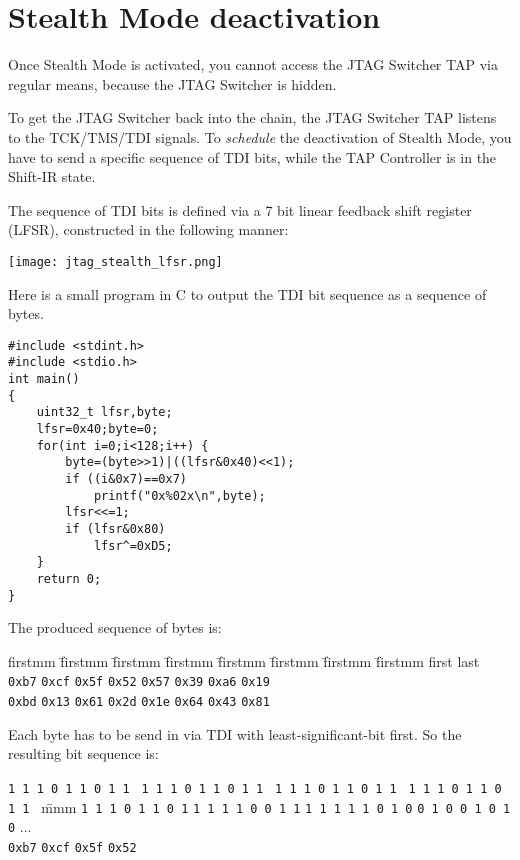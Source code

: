 \documentclass[10pt,english,a4paper]{report}
\begin{document}
\section{Stealth Mode deactivation}
Once Stealth Mode is activated, you cannot access the JTAG Switcher TAP via regular means, because
the JTAG Switcher is hidden.

To get the JTAG Switcher back into the chain, the JTAG Switcher TAP listens to the TCK/TMS/TDI signals.
To {\em schedule} the deactivation of Stealth Mode, you have to send a specific sequence of TDI bits,
while the TAP Controller is in the Shift-IR state.

The sequence of TDI bits is defined via a 7 bit linear feedback shift register (LFSR), constructed in the following manner:
\begin{center}
	\texttt{[image: jtag\_stealth\_lfsr.png]}
\end{center}

Here is a small program in C to output the TDI bit sequence as a sequence of bytes.
\begin{lstlisting}
#include <stdint.h>
#include <stdio.h>
int main()
{
    uint32_t lfsr,byte;
    lfsr=0x40;byte=0;
    for(int i=0;i<128;i++) {
        byte=(byte>>1)|((lfsr&0x40)<<1);
        if ((i&0x7)==0x7)
            printf("0x%02x\n",byte);
        lfsr<<=1;
        if (lfsr&0x80)
            lfsr^=0xD5;
    }
    return 0;
}
\end{lstlisting}

\newpage
The produced sequence of bytes is:
\begin{tabbing}
firstmm \= firstmm \= firstmm \= firstmm \= firstmm \= firstmm \= firstmm \= firstmm \kill
first \>       \>       \>       \>       \>       \>       \> last  \\
{\tt 0xb7} \> {\tt 0xcf} \> {\tt 0x5f} \> {\tt 0x52} \> {\tt 0x57} \> {\tt 0x39} \> {\tt 0xa6} \> {\tt 0x19} \\
{\tt 0xbd} \> {\tt 0x13} \> {\tt 0x61} \> {\tt 0x2d} \> {\tt 0x1e} \> {\tt 0x64} \> {\tt 0x43} \> {\tt 0x81} \\
\end{tabbing}
Each byte has to be send in via TDI with least-significant-bit first. So the resulting bit sequence is:
\begin{tabbing}
{\tt 1 1 1 0 1 1 0 1 1 } \= {\tt 1 1 1 0 1 1 0 1 1 } \= {\tt 1 1 1 0 1 1 0 1 1 } \= {\tt 1 1 1 0 1 1 0 1 1 } \= mmm \kill
{\tt 1 1 1 0 1 1 0 1} \> {\tt 1 1 1 1 0 0 1 1} \> {\tt 1 1 1 1 1 0 1 0} \> {\tt 0 1 0 0 1 0 1 0} \> ...\\
{\tt 0xb7}            \> {\tt 0xcf}            \> {\tt 0x5f}            \> {\tt 0x52} \> \\
\end{tabbing}
\end{document}
